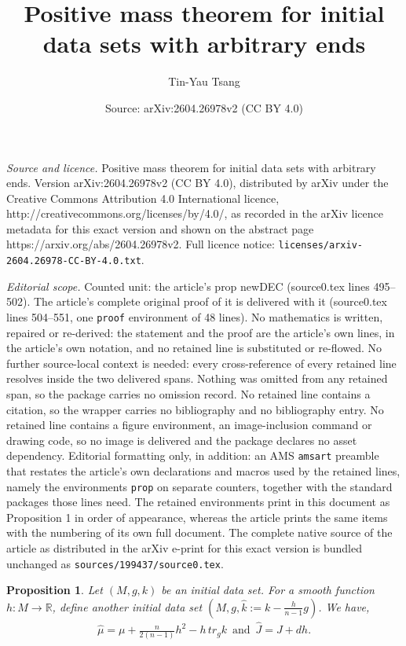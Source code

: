 \documentclass[10pt,a4paper]{amsart}
\title{Positive mass theorem for initial data sets with arbitrary ends}
\author{Tin-Yau Tsang}
\date{Source: arXiv:2604.26978v2 (CC BY 4.0)}
\newtheorem{prop}{Proposition}
\def\R{\mathbb{R}}
\newcommand{\be}{\begin{equation}}
\newcommand{\ee}{\end{equation}}
\def\h {\hat}
\begin{document}
\maketitle

\noindent\emph{Source and licence.} Positive mass theorem for initial data sets with arbitrary ends. Version arXiv:2604.26978v2 (CC BY 4.0), distributed by arXiv under the Creative Commons Attribution 4.0 International licence, http://creativecommons.org/licenses/by/4.0/, as recorded in the arXiv licence metadata for this exact version and shown on the abstract page https://arxiv.org/abs/2604.26978v2. Full licence notice: \texttt{licenses/arxiv-2604.26978-CC-BY-4.0.txt}.\par\smallskip

\noindent\textit{Editorial scope.} Counted unit: the article's prop newDEC (source0.tex lines 495--502). The article's complete original proof of it is delivered with it (source0.tex lines 504--551, one \texttt{proof} environment of 48 lines). No mathematics is written, repaired or re-derived: the statement and the proof are the article's own lines, in the article's own notation, and no retained line is substituted or re-flowed.  No further source-local context is needed: every cross-reference of every retained line resolves inside the two delivered spans.  Nothing was omitted from any retained span, so the package carries no omission record.  No retained line contains a citation, so the wrapper carries no bibliography and no bibliography entry.  No retained line contains a figure environment, an image-inclusion command or drawing code, so no image is delivered and the package declares no asset dependency.  Editorial formatting only, in addition: an AMS \texttt{amsart} preamble that restates the article's own declarations and macros used by the retained lines, namely the environments \texttt{prop} on separate counters, together with the standard packages those lines need.  The retained environments print in this document as Proposition 1 in order of appearance, whereas the article prints the same items with the numbering of its own full document.  The complete native source of the article as distributed in the arXiv e-print for this exact version is bundled unchanged as \texttt{sources/199437/source0.tex}.
\begin{prop}\label{newDEC}
Let $(M,g,k)$ be an initial data set. For a smooth function $h:M\to \R$, define another initial data set $(M,g,\hat k:=k-\frac{h}{n-1}g)$. We have, 
\be
\begin{split}
\h \mu = \mu+\frac{n}{2(n-1)}h^2-h\, tr_g k \,\,\, \text{and} \,\,\, \h J= J+dh. 
\end{split}
\ee 
\end{prop}
\end{document}
